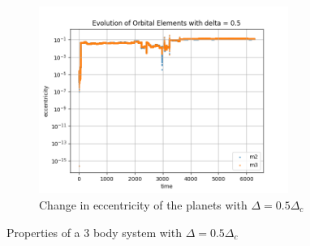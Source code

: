 \documentclass[12pt,a4paper]{article}
\begin{document}
\begin{figure}[H]
  \begin{subfigure}{0.4\textwidth}
    \centering
    \includegraphics[height = 2.4in]{3Body/3BD_ecc_delta0.5.png}
    \caption{Change in eccentricity of the planets with $\Delta = 0.5\Delta_c$}
    \label{fig:3Body_0.5_ecc}
  \end{subfigure}
  \caption{Properties of a 3 body system with $\Delta = 0.5\Delta_c$}
\end{figure}
\end{document}
